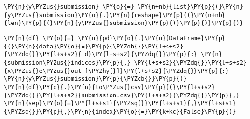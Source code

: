     \begin{tcolorbox}[breakable, size=fbox, boxrule=1pt, pad at break*=1mm,colback=cellbackground, colframe=cellborder]
\begin{Verbatim}[commandchars=\\\{\}]
\PY{n}{y\PYZus{}submission} \PY{o}{=} \PY{n+nb}{list}\PY{p}{(}\PY{n}{y\PYZus{}submission}\PY{o}{.}\PY{n}{reshape}\PY{p}{(}\PY{n+nb}{len}\PY{p}{(}\PY{n}{y\PYZus{}submission}\PY{p}{)}\PY{p}{)}\PY{p}{)}
\end{Verbatim}
\end{tcolorbox}

    \begin{tcolorbox}[breakable, size=fbox, boxrule=1pt, pad at break*=1mm,colback=cellbackground, colframe=cellborder]
\begin{Verbatim}[commandchars=\\\{\}]
\PY{n}{df} \PY{o}{=} \PY{n}{pd}\PY{o}{.}\PY{n}{DataFrame}\PY{p}{(}\PY{n}{data}\PY{o}{=}\PY{p}{\PYZob{}}\PY{l+s+s2}{\PYZdq{}}\PY{l+s+s2}{id}\PY{l+s+s2}{\PYZdq{}}\PY{p}{:} \PY{n}{submission\PYZus{}indices}\PY{p}{,} \PY{l+s+s2}{\PYZdq{}}\PY{l+s+s2}{x\PYZus{}e\PYZus{}out [\PYZhy{}]}\PY{l+s+s2}{\PYZdq{}}\PY{p}{:} \PY{n}{y\PYZus{}submission}\PY{p}{\PYZcb{}}\PY{p}{)}
\PY{n}{df}\PY{o}{.}\PY{n}{to\PYZus{}csv}\PY{p}{(}\PY{l+s+s2}{\PYZdq{}}\PY{l+s+s2}{submission.csv}\PY{l+s+s2}{\PYZdq{}}\PY{p}{,} \PY{n}{sep}\PY{o}{=}\PY{l+s+s1}{\PYZsq{}}\PY{l+s+s1}{,}\PY{l+s+s1}{\PYZsq{}}\PY{p}{,}\PY{n}{index}\PY{o}{=}\PY{k+kc}{False}\PY{p}{)}
\end{Verbatim}
\end{tcolorbox}

    \begin{tcolorbox}[breakable, size=fbox, boxrule=1pt, pad at break*=1mm,colback=cellbackground, colframe=cellborder]
\begin{Verbatim}[commandchars=\\\{\}]

\end{Verbatim}
\end{tcolorbox}


    
    
    

